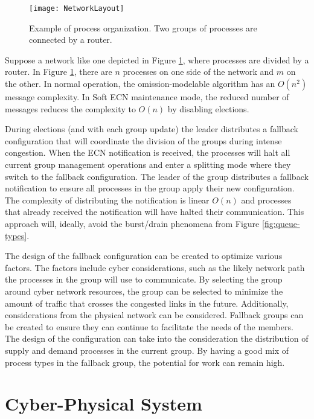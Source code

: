 \begin{figure}
\centering
\texttt{[image: NetworkLayout]}
\caption[Example of process organization]{Example of process organization. Two groups of processes are connected by a router.} \label{fig:network-layout}
\end{figure}

Suppose a network like one depicted in Figure \ref{fig:network-layout}, where processes are divided by a router.
In Figure \ref{fig:network-layout}, there are $n$ processes on one side of the network and $m$ on the other.
In normal operation, the omission-modelable algorithm has an $O(n^2)$ message complexity.
In Soft \ac{ECN} maintenance mode, the reduced number of messages reduces the complexity to $O(n)$ by disabling elections.

During elections (and with each group update) the leader distributes a fallback configuration that will coordinate the division of the groups during intense congestion.
When the \ac{ECN} notification is received, the processes will halt all current group management operations and enter a splitting mode where they switch to the fallback configuration.
The leader of the group distributes a fallback notification to ensure all processes in the group apply their new configuration. 
The complexity of distributing the notification is linear $O(n)$ and processes that already received the notification will have halted their communication.
This approach will, ideally, avoid the burst/drain phenomena from Figure \ref{fig:queue-types}.

The design of the fallback configuration can be created to optimize various factors.
The factors include cyber considerations, such as the likely network path the processes in the group will use to communicate.
By selecting the group around cyber network resources, the group can be selected to minimize the amount of traffic that crosses the congested links in the future.
Additionally, considerations from the physical network can be considered.
Fallback groups can be created to ensure they can continue to facilitate the needs of the members.
The design of the configuration can take into the consideration the distribution of supply and demand processes in the current group.
By having a good mix of process types in the fallback group, the potential for work can remain high.

\section{Cyber-Physical System}

